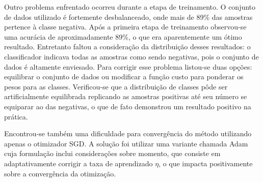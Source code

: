 Outro problema enfrentado ocorreu durante a etapa de treinamento. O conjunto de dados utilizado é fortemente desbalanceado, onde mais de 89\% das amostras pertence à classe negativa. Após a primeira etapa de treinamento observou-se uma acurácia de aproximadamente 89\%, o que era aparentemente um ótimo resultado. Entretanto faltou a consideração da distribuição desses resultados: o classificador indicava todas as amostras como sendo negativas, pois o conjunto de dados é altamente enviesado. Para corrigir esse problema listou-se duas opções: equilibrar o conjunto de dados ou modificar a função custo para ponderar os pesos para as classes. Verificou-se que a distribuição de classes pôde ser artificialmente equilibrada replicando as amostras positivas até seu número se equiparar ao das negativas, o que de fato demonstrou um resultado positivo na prática.

Encontrou-se também uma dificuldade para convergência do método utilizando apenas o otimizador SGD. A solução foi utilizar uma variante chamada Adam \cite{kingma2014adam} cuja formulação inclui considerações sobre momento, que consiste em adaptativamente corrigir a taxa de aprendizado $\eta$, o que impacta positivamente sobre a convergência da otimização.

